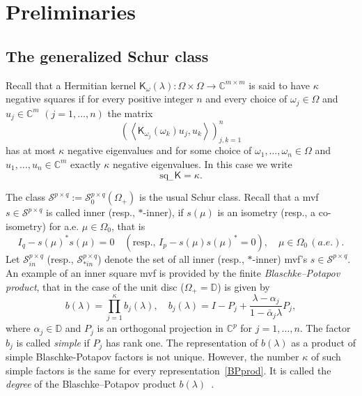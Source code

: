 \documentclass[12pt,twoside,a4paper]{amsart}
\theoremstyle{definition}
\numberwithin{equation}{section}
\begin{document}
\section{Preliminaries \label{preli}}

\subsection{The generalized Schur class}
Recall that a Hermitian kernel  ${\mathsf
K}_\omega(\lambda):\Omega\times\Omega\to{{\mathbb C}}^{m\times m}$ is said to
have $\kappa $ negative squares
if for every positive integer $n$ and every choice of $\omega_j\in\Omega$
and $u_j\in{{\mathbb C}}^m$
$(j=1,\dots,n)$ the matrix
\[
\left(\left<{\mathsf
K}_{\omega_j}(\omega_k)u_j,u_k\right>\right)_{j,k=1}^n
\]
has at most $\kappa$ negative eigenvalues and for some choice of
$\omega_1,\ldots,\omega_n\in\Omega$ and $u_1,\ldots,u_n\in{{\mathbb C}}^m$ exactly
$\kappa$ negative
eigenvalues. In this case we write
\[
\mbox{sq}_-{\mathsf K}=\kappa.
\]

The class ${\mathcal S}^{p\times q}:={\mathcal S}_{0}^{p\times q}(\Omega_+)$ is the
usual
Schur class.
Recall that a mvf $s\in {\mathcal S}^{p\times q}$ is called inner
(resp., $*$-inner), if
$s(\mu)$ is an isometry (resp., a co-isometry) for a.e.
$\mu\in\Omega_0$, that is
\[
I_q-s(\mu)^*s(\mu)=0 \quad (\mbox{resp., } I_p-s(\mu)s(\mu)^*=0), \quad \mu\in\Omega_0\,
(a.e.).
\]
Let ${\mathcal S}_{in}^{p\times q}$ (resp., ${\mathcal S}_{*in}^{p\times q}$)
denote the set of all
inner (resp., $*$-inner) mvf's $s\in {\mathcal S}^{p\times q}$. An example of
an inner square mvf is provided by the finite {\it Blaschke--Potapov product},
that in the case of the unit
disc ($\Omega_+={{\mathbb D}}$) is given by
\begin{equation}\label{BPprod}
b({\lambda})=\prod_{j=1}^{\kappa}b_j({\lambda}),\quad
b_j({\lambda})=I-P_j+\frac{{\lambda}-\alpha_j}{1-\bar\alpha_j {\lambda}}P_j,
\end{equation}
where $\alpha_j\in{{\mathbb D}}$ and  $P_j$ is an orthogonal projection in ${{\mathbb C}}^p$ for
$j=1,\dots ,n$. The factor $b_j$ is called {\it simple} if $P_j$
has rank one. The representation of $b({\lambda})$ as a
product of simple Blaschke-Potapov factors is not unique. However, the number
$\kappa$ of such simple factors is
the same for every representation~\eqref{BPprod}. It is called the
{\it degree} of the Blaschke--Potapov product
$b({\lambda})$~\cite{Pot}.
\end{document}
